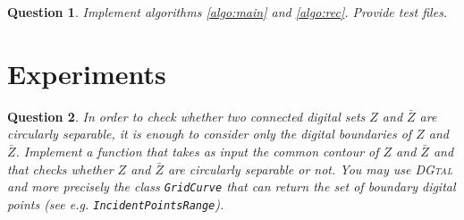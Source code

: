 \documentclass[a4paper, 11pt]{article}
\newtheorem{qu}{Question}
\begin{document}

\begin{qu}
Implement algorithms \ref{algo:main} and \ref{algo:rec}. Provide test files. 
\end{qu}

\section{Experiments}

  



\begin{qu}
In order to check whether two connected digital sets $Z$ and $\bar{Z}$ are circularly separable, 
it is enough to consider only the digital boundaries of $Z$ and $\bar{Z}$. Implement a function
that takes as input the common contour of $Z$ and $\bar{Z}$ and that checks whether $Z$ and $\bar{Z}$
are circularly separable or not. You may use \textsc{DGtal} and more precisely the class {\tt GridCurve}
that can return the set of boundary digital points (see e.g. {\tt IncidentPointsRange}).    
\end{qu}
\end{document}
